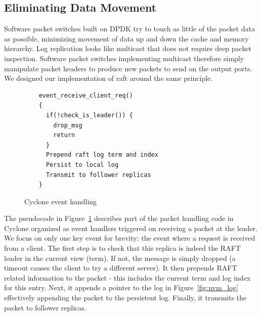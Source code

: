 \documentclass[pageno]{jpaper}
\begin{document}
\subsection{Eliminating Data Movement}
\label{sec:dm}
Software packet switches built on DPDK try to touch as little of the packet data
as possible, minimizing movement of data up and down the cache and memory
hierarchy. Log replication looks like multicast that does not require deep
packet inspection. Software packet switches implementing multicast therefore
simply manipulate packet headers to produce new packets to send on the output
ports. We designed our implementation of raft around the same principle.

\begin{figure}
\begin{verbatim}
    event_receive_client_req()
    {
      if(!check_is_leader()) {
        drop_msg
        return
      }
      Prepend raft log term and index
      Persist to local log
      Transmit to follower replicas
    }
\end{verbatim}
\caption{Cyclone event handling}
\label{fig:control_plane}
\end{figure}


The pseudocode in Figure~\ref{fig:control_plane} describes part of the packet
handling code in Cyclone organized as event handlers triggered on receiving a
packet at the leader. We focus on only one key event for brevity: the event
where a request is received from a client. The first step is to check that this
replica is indeed the RAFT leader in the current view (term). If not, the
message is simply dropped (a timeout causes the client to try a different
server). It then prepends RAFT related information to the packet - this includes
the current term and log index for this entry. Next, it appends a pointer to the
log in Figure~\ref{fig:nvm_log} effectively appending the packet to the
persistent log. Finally, it transmits the packet to follower replicas.
\end{document}
